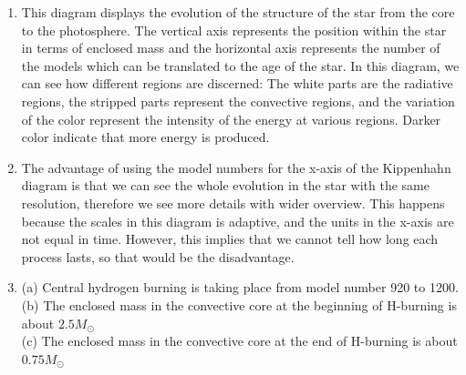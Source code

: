 \documentclass{article}
\begin{document}
\begin{enumerate}
    \item This diagram displays the evolution of the structure of the star from the core to the photosphere. The vertical axis represents the position within the star in terms of enclosed mass and the horizontal axis represents the number of the models which can be translated to the age of the star. In this diagram, we can see how different regions are discerned: The white parts are the radiative regions, the stripped parts represent the convective regions, and the variation of the color represent the intensity of the energy at various regions. Darker color indicate that more energy is produced. 
    \item The advantage of using the model numbers for the x-axis of the Kippenhahn diagram is that we can see the whole evolution in the star with the same resolution, therefore we see more details with wider overview. This happens because the scales in this diagram is adaptive, and the units in the x-axis are not equal in time. However, this implies that we cannot tell how long each process lasts, so that would be the disadvantage. 
    

    \item (a) Central hydrogen burning is taking place from model number 920 to 1200.
    \\
    (b) The enclosed mass in the convective core at the beginning of H-burning is about $2.5 M_{\odot}$
    \\
    (c) The enclosed mass in the convective core at the end of H-burning is about $0.75 M_{\odot}$
    

\end{enumerate}
\end{document}
